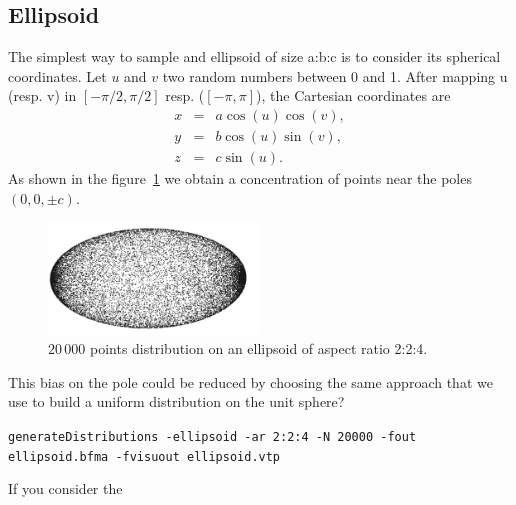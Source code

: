 \documentclass[10pt]{article}
\begin{document}
\subsection{Ellipsoid}
\label{nonuniEllipsoid}
The simplest way to sample and ellipsoid of size a:b:c is to consider its spherical coordinates. Let $u$ and $v$ two random numbers between 0 and 1. After mapping u (resp. v) in $[-\pi/2,\pi/2]$ resp. ($[-\pi,\pi]$), the Cartesian coordinates are    
\begin{eqnarray*}
x	&=&	a\cos(u)\cos(v),\\
y	&=&	b\cos(u)\sin(v), \\
z  &=&	c\sin(u).
\end{eqnarray*}
As shown in the figure~\ref{Fig-nonUnifEllipsoid} we obtain a concentration of points near the poles $(0,0,\pm c)$.
\begin{figure}[hbt]
  \centering
   \includegraphics[width=0.5\textwidth]{ellipsoid}
    \caption{$20\,000$ points distribution on an ellipsoid of aspect ratio 2:2:4.}%
    \label{Fig-nonUnifEllipsoid}
\end{figure}
This bias on the pole could be reduced by choosing the same approach that we use to build a uniform distribution on the unit sphere?


\texttt{generateDistributions -ellipsoid -ar 2:2:4   -N 20000 -fout ellipsoid.bfma  -fvisuout ellipsoid.vtp}

If you consider the 
\end{document}
